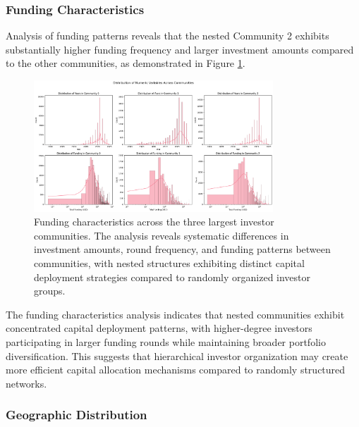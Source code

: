 \subsubsection{Funding Characteristics}

Analysis of funding patterns reveals that the nested Community 2 exhibits substantially higher funding frequency and larger investment amounts compared to the other communities, as demonstrated in Figure \ref{fig:funding_characteristics}.


\begin{figure}[htbp]
\centering
\includegraphics[width=0.8\textwidth]{./assets/funding-characteristics.png}
\caption{Funding characteristics across the three largest investor communities. The analysis reveals systematic differences in investment amounts, round frequency, and funding patterns between communities, with nested structures exhibiting distinct capital deployment strategies compared to randomly organized investor groups.}
\label{fig:funding_characteristics}
\end{figure}


The funding characteristics analysis indicates that nested communities exhibit concentrated capital deployment patterns, with higher-degree investors participating in larger funding rounds while maintaining broader portfolio diversification. This suggests that hierarchical investor organization may create more efficient capital allocation mechanisms compared to randomly structured networks.


\subsubsection{Geographic Distribution}

